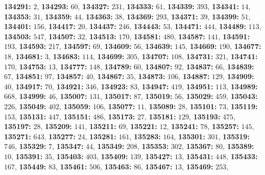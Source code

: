 \textsf{\bfseries 134291:} $2$, \textsf{\bfseries 134293:} $60$, \textsf{\bfseries 134327:} $231$, \textsf{\bfseries 134333:} $61$, \textsf{\bfseries 134339:} $393$, \textsf{\bfseries 134341:} $14$, \textsf{\bfseries 134353:} $31$, \textsf{\bfseries 134359:} $44$, \textsf{\bfseries 134363:} $38$, \textsf{\bfseries 134369:} $293$, \textsf{\bfseries 134371:} $39$, \textsf{\bfseries 134399:} $51$, \textsf{\bfseries 134401:} $156$, \textsf{\bfseries 134417:} $20$, \textsf{\bfseries 134437:} $246$, \textsf{\bfseries 134443:} $53$, \textsf{\bfseries 134471:} $444$, \textsf{\bfseries 134489:} $113$, \textsf{\bfseries 134503:} $547$, \textsf{\bfseries 134507:} $32$, \textsf{\bfseries 134513:} $170$, \textsf{\bfseries 134581:} $480$, \textsf{\bfseries 134587:} $141$, \textsf{\bfseries 134591:} $193$, \textsf{\bfseries 134593:} $217$, \textsf{\bfseries 134597:} $69$, \textsf{\bfseries 134609:} $56$, \textsf{\bfseries 134639:} $145$, \textsf{\bfseries 134669:} $190$, \textsf{\bfseries 134677:} $18$, \textsf{\bfseries 134681:} $3$, \textsf{\bfseries 134683:} $114$, \textsf{\bfseries 134699:} $305$, \textsf{\bfseries 134707:} $108$, \textsf{\bfseries 134731:} $321$, \textsf{\bfseries 134741:} $170$, \textsf{\bfseries 134753:} $13$, \textsf{\bfseries 134777:} $148$, \textsf{\bfseries 134789:} $60$, \textsf{\bfseries 134807:} $92$, \textsf{\bfseries 134837:} $66$, \textsf{\bfseries 134839:} $67$, \textsf{\bfseries 134851:} $97$, \textsf{\bfseries 134857:} $40$, \textsf{\bfseries 134867:} $35$, \textsf{\bfseries 134873:} $106$, \textsf{\bfseries 134887:} $129$, \textsf{\bfseries 134909:} $40$, \textsf{\bfseries 134917:} $70$, \textsf{\bfseries 134921:} $346$, \textsf{\bfseries 134923:} $83$, \textsf{\bfseries 134947:} $419$, \textsf{\bfseries 134951:} $113$, \textsf{\bfseries 134989:} $668$, \textsf{\bfseries 134999:} $46$, \textsf{\bfseries 135007:} $131$, \textsf{\bfseries 135017:} $87$, \textsf{\bfseries 135019:} $56$, \textsf{\bfseries 135029:} $459$, \textsf{\bfseries 135043:} $226$, \textsf{\bfseries 135049:} $402$, \textsf{\bfseries 135059:} $106$, \textsf{\bfseries 135077:} $11$, \textsf{\bfseries 135089:} $28$, \textsf{\bfseries 135101:} $73$, \textsf{\bfseries 135119:} $153$, \textsf{\bfseries 135131:} $447$, \textsf{\bfseries 135151:} $486$, \textsf{\bfseries 135173:} $27$, \textsf{\bfseries 135181:} $129$, \textsf{\bfseries 135193:} $475$, \textsf{\bfseries 135197:} $28$, \textsf{\bfseries 135209:} $141$, \textsf{\bfseries 135211:} $69$, \textsf{\bfseries 135221:} $12$, \textsf{\bfseries 135241:} $78$, \textsf{\bfseries 135257:} $145$, \textsf{\bfseries 135271:} $643$, \textsf{\bfseries 135277:} $24$, \textsf{\bfseries 135281:} $161$, \textsf{\bfseries 135283:} $164$, \textsf{\bfseries 135301:} $301$, \textsf{\bfseries 135319:} $746$, \textsf{\bfseries 135329:} $7$, \textsf{\bfseries 135347:} $44$, \textsf{\bfseries 135349:} $208$, \textsf{\bfseries 135353:} $302$, \textsf{\bfseries 135367:} $80$, \textsf{\bfseries 135389:} $10$, \textsf{\bfseries 135391:} $35$, \textsf{\bfseries 135403:} $403$, \textsf{\bfseries 135409:} $139$, \textsf{\bfseries 135427:} $13$, \textsf{\bfseries 135431:} $448$, \textsf{\bfseries 135433:} $167$, \textsf{\bfseries 135449:} $83$, \textsf{\bfseries 135461:} $506$, \textsf{\bfseries 135463:} $86$, \textsf{\bfseries 135467:} $13$, \textsf{\bfseries 135469:} $253$, 
